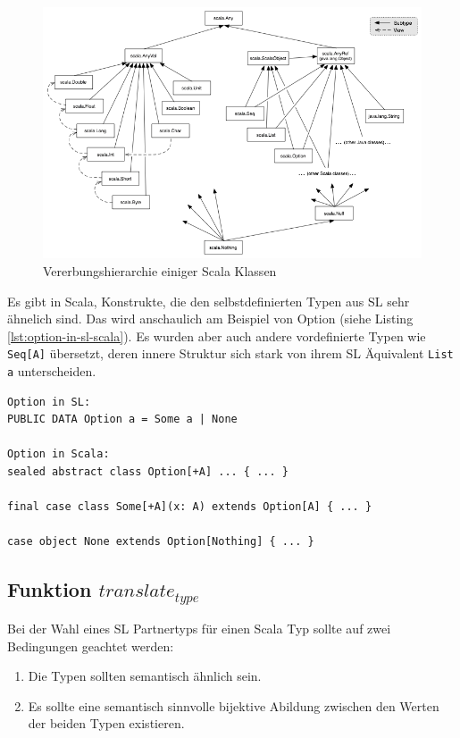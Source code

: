 \documentclass[12pt]{scrreprt}
\begin{document}
\begin{figure}[h] 
  \centering
     \includegraphics[width=\textwidth]{Bilder/classhierarchy}
  \caption{Vererbungshierarchie einiger Scala Klassen}
  \label{fig:classhierarchy}
\end{figure}

Es gibt in Scala, Konstrukte, die den selbstdefinierten Typen aus \ac{SL} sehr ähnelich sind. Das wird anschaulich am Beispiel von Option (siehe Listing \ref{lst:option-in-sl-scala}). Es wurden aber auch andere vordefinierte Typen wie \lstinline!Seq[A]! übersetzt, deren innere Struktur sich stark von ihrem SL Äquivalent \lstinline!List a! unterscheiden.

\begin{lstlisting}[caption=Option in \ac{SL} und Scala, label=lst:option-in-sl-scala, float=h]
Option in SL:
PUBLIC DATA Option a = Some a | None

Option in Scala:
sealed abstract class Option[+A] ... { ... }

final case class Some[+A](x: A) extends Option[A] { ... }

case object None extends Option[Nothing] { ... }
\end{lstlisting}

\subsection{Funktion $translate_{type}$}
\label{subsec:translate_type}

Bei der Wahl eines SL Partnertyps für einen Scala Typ sollte auf zwei Bedingungen geachtet werden:

\begin{enumerate}
 \item{Die Typen sollten semantisch ähnlich sein.}
 \item{Es sollte eine semantisch sinnvolle bijektive Abildung zwischen den Werten der beiden Typen existieren. }
\end{enumerate}
\end{document}
